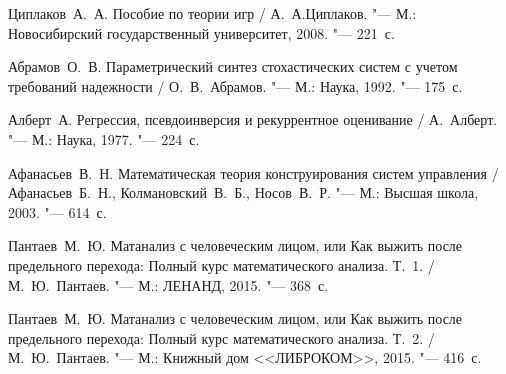 \begin{thebibliography}{99}

Циплаков~А.~А. Пособие по теории игр / А.~А.Циплаков. "--- М.: Новосибирский государственный университет, 2008. "--- 221~с.

Абрамов~О.~В. Параметрический синтез стохастических систем с учетом
требований надежности / О.~В.~Абрамов. "--- М.: Наука, 1992. "--- 175~с.

Алберт~А. Регрессия, псевдоинверсия и рекуррентное оценивание /
А.~Алберт. "--- М.: Наука, 1977. "--- 224~с.

Афанасьев~В.~Н. Математическая теория конструирования систем
управления / Афанасьев~Б.~Н., Колмановский~В.~Б., Носов~В.~Р. "--- М.: Высшая школа, 2003. "--- 614~с.

Пантаев~М.~Ю. Матанализ с человеческим лицом, или Как выжить после предельного перехода: Полный курс математического анализа. Т.~1. / М.~Ю.~Пантаев. "--- М.: ЛЕНАНД, 2015. "--- 368~с.

Пантаев~М.~Ю. Матанализ с человеческим лицом, или Как выжить после предельного перехода: Полный курс математического анализа. Т.~2. / М.~Ю.~Пантаев. "--- М.: Книжный дом <<ЛИБРОКОМ>>, 2015. "--- 416~с.

\end{thebibliography}
